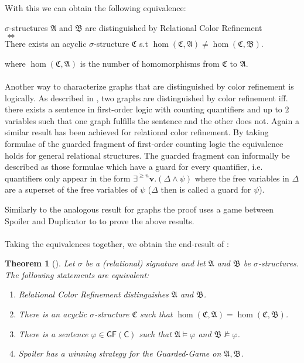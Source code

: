 \documentclass[a4paper,11pt,DIV=15]{scrartcl} %
\theoremstyle{plain}
\newtheorem{theorem}{Theorem}
\theoremstyle{definition}
\begin{document}
With this we can obtain the following equivalence:
\begin{center}
$\sigma$-structures $\mathfrak{A}$ and $\mathfrak{B}$ are distinguished by Relational Color Refinement \\ $\Leftrightarrow$ \\ There exists an acyclic $\sigma$-structure $\mathfrak{C}$ s.t $\hom(\mathfrak C, \mathfrak A)\neq\hom(\mathfrak C,\mathfrak B)$.
\end{center}
where $\hom(\mathfrak C,\mathfrak A)$ is the number of homomorphisms from $\mathfrak C$ to $\mathfrak A$.
\\ \\
Another way to characterize graphs that are distinguished by color refinement is logically.
As described in \cite{cai1992optimal}, two graphs are distinguished by color refinement iff. there exists a sentence in first-order logic with counting quantifiers and up to $2$ variables such that one graph fulfills the sentence and the other does not.
Again a similar result has been achieved for relational color refinement.
By taking formulae of the guarded fragment of first-order counting logic the equivalence holds for general relational structures.
The guarded fragment can informally be described as those formulae which have a guard for every quantifier, i.e. quantifiers only appear in the form $\exists^{\geq n}\mathbf v.(\Delta \land \psi)$ where the free variables in $\Delta$ are a superset of the free variables of $\psi$ ($\Delta$ then is called a guard for $\psi$).

Similarly to the analogous result for graphs the proof uses a game between Spoiler and Duplicator to to prove the above results.
\\ \\
Taking the equivalences together, we obtain the end-result of \cite{scheidt2024color}:

\begin{theorem}[\cite{scheidt2024color}]
	Let $\sigma$ be a (relational) signature and let $\mathfrak A$ and $\mathfrak B$ be $\sigma$-structures. The following statements are equivalent:
	\begin{enumerate}
		\item Relational Color Refinement distinguishes $\mathfrak A$ and $\mathfrak B$.
		\item There is an acyclic $\sigma$-structure $\mathfrak C$ such that $\hom(\mathfrak C,\mathfrak A)=\hom(\mathfrak C,\mathfrak B)$.
		\item There is a sentence $\varphi\in \mathsf{GF(C)}$ such that $\mathfrak A\models\varphi$ and $\mathfrak B\not\models\varphi$.
		\item Spoiler has a winning strategy for the Guarded-Game on $\mathfrak A,\mathfrak B$.
	\end{enumerate}
	\label{RCRMainThm}
\end{theorem}
\end{document}
